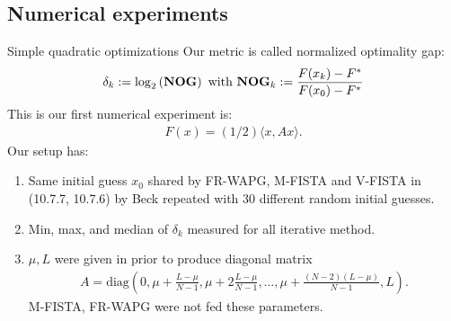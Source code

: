 \documentclass[11pt]{beamer}
\theoremstyle{definition}
\begin{document}
    \subsection{Numerical experiments}
        \begin{frame}{Simple quadratic optimizations}
            Our metric is called normalized optimality gap: 
            \newcommand{\NOG}{\text{\textbf{NOG}}}
            {\footnotesize
            \begin{align*}
                \delta_k := \log_2\left(
                    \NOG
                \right)
                \text{ with } 
                \NOG_k := \frac{F(x_k) - F^*}{F(x_0) - F^*}
            \end{align*}
            }
            This is our first numerical experiment is: 
            \begin{align*}
                F(x) = (1/2)\langle x, A x\rangle. 
            \end{align*}
            Our setup has: 
            \begin{enumerate}
                \item Same initial guess $x_0$ shared by FR-WAPG,  M-FISTA and V-FISTA in (10.7.7, 10.7.6) by Beck \cite{beck_first-order_2017} repeated with 30 different random initial guesses. 
                \item Min, max, and median of $\delta_k$ measured for all iterative method.
                \item $\mu, L$ were given in prior to produce diagonal matrix 
                {\footnotesize
                \begin{align*}
                    A = \text{diag}
                    \left(0, 
                        \mu + \frac{L - \mu}{N - 1},
                        \mu + 2\frac{L - \mu}{N - 1}, 
                        \ldots, 
                        \mu + \frac{(N - 2)(L - \mu)}{N - 1}, 
                        L
                    \right). 
                \end{align*}
                }
                M-FISTA, FR-WAPG were not fed these parameters. 
            \end{enumerate}
        \end{frame}
\end{document}
